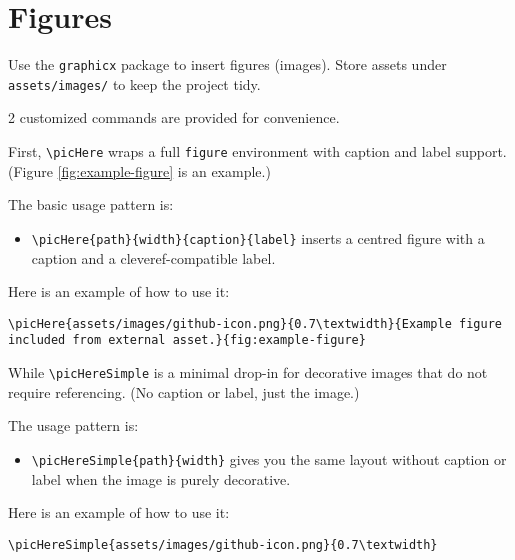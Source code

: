 \newpage
\section{Figures}

Use the \texttt{graphicx} package to insert figures (images). Store assets under \texttt{assets/images/} to keep the project tidy.

2 customized commands are provided for convenience. 


First, \texttt{\textbackslash picHere} wraps a full \texttt{figure} environment with caption and label support. (Figure \ref{fig:example-figure} is an example.)

The basic usage pattern is:

\begin{itemize}
  \item \texttt{\textbackslash picHere\{path\}\{width\}\{caption\}\{label\}} inserts a centred figure with a caption and a cleveref-compatible label.
\end{itemize}

Here is an example of how to use it:

\begin{lstlisting}[style=githubLight, language={[LaTeX]TeX}, caption={Using the figure helpers in a listing block.}, label={lst:figure-helper-macros}]
\picHere{assets/images/github-icon.png}{0.7\textwidth}{Example figure included from external asset.}{fig:example-figure}
\end{lstlisting}


While \texttt{\textbackslash picHereSimple} is a minimal drop-in for decorative images that do not require referencing. (No caption or label, just the image.)

The usage pattern is:

\begin{itemize}
    \item \texttt{\textbackslash picHereSimple\{path\}\{width\}} gives you the same layout without caption or label when the image is purely decorative.
\end{itemize}

Here is an example of how to use it:

\begin{lstlisting}[style=githubLight, language={[LaTeX]TeX}, caption={Using the figure helpers in a listing block.}, label={lst:figure-helper-macros}]
    \picHereSimple{assets/images/github-icon.png}{0.7\textwidth}
\end{lstlisting}